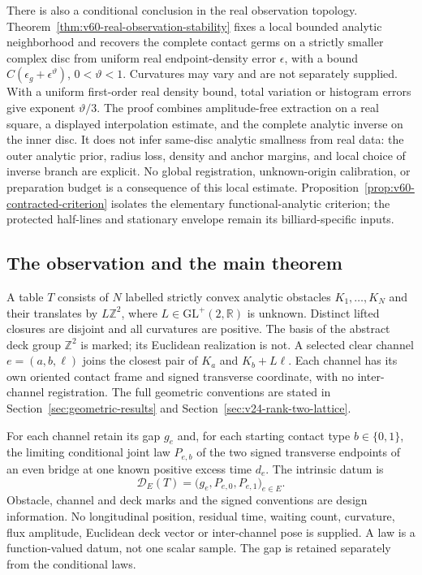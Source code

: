 There is also a conditional conclusion in the real observation topology.
Theorem~\ref{thm:v60-real-observation-stability} fixes a local bounded
analytic neighborhood and recovers the complete contact germs on a
strictly smaller complex disc from uniform real endpoint-density error
$\epsilon$, with a bound $C(\epsilon_g+\epsilon^\vartheta)$,
$0<\vartheta<1$.  Curvatures may vary and are not separately supplied.
With a uniform first-order real density bound, total variation or
histogram errors give exponent $\vartheta/3$.  The proof combines
amplitude-free extraction on a real square, a displayed interpolation
estimate, and the complete analytic inverse on the inner disc.
It does not infer same-disc analytic smallness from real data: the
outer analytic prior, radius loss, density and anchor margins, and
local choice of inverse branch are explicit.  No global registration,
unknown-origin calibration, or preparation budget is a consequence of
this local estimate.  Proposition~\ref{prop:v60-contracted-criterion}
isolates the elementary functional-analytic criterion; the protected
half-lines and stationary envelope remain its billiard-specific inputs.


\subsection{The observation and the main theorem}

A table $T$ consists of $N$ labelled strictly convex analytic obstacles
$K_1,\ldots,K_N$ and their translates by $L\mathbb Z^2$, where
$L\in\mathrm{GL}^+(2,\mathbb R)$ is unknown.  Distinct lifted closures
are disjoint and all curvatures are positive.  The basis of the abstract
deck group $\mathbb Z^2$ is marked; its Euclidean realization is not.
A selected clear channel $e=(a,b,\ell)$ joins the closest pair of
$K_a$ and $K_b+L\ell$.  Each channel has its own oriented contact frame
and signed transverse coordinate, with no inter-channel registration.
The full geometric conventions are stated in
Section~\ref{sec:geometric-results} and
Section~\ref{sec:v24-rank-two-lattice}.

For each channel retain its gap $g_e$ and, for each starting contact type
$b\in\{0,1\}$, the limiting conditional joint law $P_{e,b}$ of the two
signed transverse endpoints of an even bridge at one known positive
excess time $d_e$.  The intrinsic datum is
\begin{equation}\label{eq:v48-datum}
       \mathcal D_E(T)=\bigl(g_e,P_{e,0},P_{e,1}\bigr)_{e\in E}.
\end{equation}
Obstacle, channel and deck marks and the signed conventions are design
information.  No longitudinal position, residual time, waiting count,
curvature, flux amplitude, Euclidean deck vector or inter-channel pose
is supplied.  A law is a function-valued datum, not one scalar sample.
The gap is retained separately from the conditional laws.

